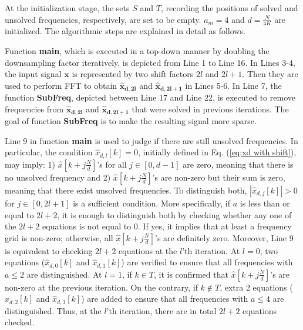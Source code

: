 \documentclass[journal,onecolumn,11pt]{IEEEtran}
\begin{document}
At the initialization stage, the sets $S$ and $T$, recording the positions of solved and unsolved frequencies, respectively, are set to be empty.
$a_m = 4$ and $d = \frac{N}{4K}$ are initialized.
The algorithmic steps are explained in detail as follows.

Function \textbf{main}, which is executed in a top-down manner by doubling the downsampling factor iteratively, is depicted from Line 1 to Line 16.
In Lines 3-4, the input signal $\bm{x}$ is represented by two shift factors $2l$ and $2l+1$.
Then they are used to perform FFT to obtain $\bm{\hat{x}_{d,2l}}$ and $\bm{\hat{x}_{d,2l+1}}$ in Lines 5-6.
In Line 7, the function \textbf{SubFreq}, depicted between Line 17 and Line 22, is executed to remove frequencies from $\bm{\hat{x}_{d,2l}}$ and $\bm{\hat{x}_{d,2l+1}}$ that were solved in previous iterations.
The goal of function \textbf{SubFreq} is to make the resulting signal more sparse.

Line 9 in function \textbf{main} is used to judge if there are still unsolved frequencies.
In particular, the condition $\hat{x}_{d,l}[k]=0$, initially defined in Eq. (\ref{eq:xd with shift}), may imply:
1) $  \hat{x}[k+j\frac{N}{d}]$'s for all $j \in [0,d-1]$ are zero, meaning that there is no unsolved frequency and
2) $  \hat{x}[k+j\frac{N}{d}]$'s are non-zero but their sum is zero, meaning that there exist unsolved frequencies.
To distinguish both, $|\hat{x}_{d,j}[k]| > 0$ for $j\in [0,2l+1]$ is a sufficient condition.
More specifically, if $a$ is less than or equal to $2l+2$, it is enough to distinguish both by checking whether any one of the $2l+2$ equations is not equal to $0$.
If yes, it implies that at least a frequency grid is non-zero; otherwise, all $  \hat{x}[k+j\frac{N}{d}]$'s are definitely zero.
Moreover, Line 9 is equivalent to checking $2l + 2$ equations at the $l$'th iteration.
At $l=0$, two equations ($ \hat{x}_{d,0}[k] $ and $ \hat{x}_{d,1}[k] $) are verified to ensure that all frequencies with $a\leq2$ are distinguished.
At $l=1$, if $k \in T$, it is confirmed that $  \hat{x}[k+j\frac{N}{d}]$'s are non-zero at the previous iteration.
On the contrary, if $k \notin T$, extra 2 equations ($ \hat{x}_{d,2}[k] $ and $ \hat{x}_{d,3}[k] $) are added to ensure that all frequencies with $a\leq4$ are distinguished.
Thus, at the $l$'th iteration, there are in total $2l+2$ equations checked.
\end{document}
